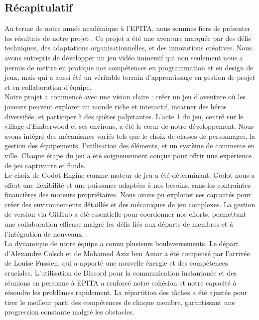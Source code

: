 

\subsection{Récapitulatif}

Au terme de notre année académique à l'EPITA, nous sommes fiers de présenter les résultats de notre projet \gameName.
Ce projet a été une aventure marquée par des défis techniques, des adaptations organisationnelles, et des innovations créatives.
Nous avons entrepris de développer un jeu vidéo immersif qui non seulement nous a permis de mettre en pratique nos compétences en programmation et en design de jeux,
mais qui a aussi été un véritable terrain d'apprentissage en gestion de projet et en collaboration d'équipe.
\\

Notre projet a commencé avec une vision claire : créer un jeu d'aventure où les joueurs peuvent explorer un monde riche et interactif,
incarner des héros diversifiés, et participer à des quêtes palpitantes. L'acte 1 du jeu, centré sur le village d'Emberwood et ses environs,
a été le cœur de notre développement. Nous avons intégré des mécanismes variés tels que le choix de classes de personnages, la gestion des équipements,
l'utilisation des éléments, et un système de commerce en ville. Chaque étape du jeu a été soigneusement conçue pour offrir une expérience de jeu captivante et fluide.
\\

Le choix de Godot Engine comme moteur de jeu a été déterminant. Godot nous a offert une flexibilité et une puissance adaptées à nos besoins,
sans les contraintes financières des moteurs propriétaires. Nous avons pu exploiter ses capacités pour créer des environnements détaillés et
des mécaniques de jeu complexes. La gestion de version via GitHub a été essentielle pour coordonner nos efforts, permettant une collaboration
efficace malgré les défis liés aux départs de membres et à l'intégration de nouveaux.
\\

La dynamique de notre équipe a connu plusieurs bouleversements.
Le départ d'Alexandre Colsch et de Mohamed Aziz ben Amor a été compensé par l'arrivée de Louise Fussien, qui a apporté une nouvelle énergie et des compétences cruciales. L'utilisation de Discord pour la communication instantanée et des réunions en personne à EPITA a renforcé notre cohésion et notre capacité à résoudre les problèmes rapidement.
La répartition des tâches a été ajustée pour tirer le meilleur parti des compétences de chaque membre, garantissant une progression constante malgré les obstacles.
\\

